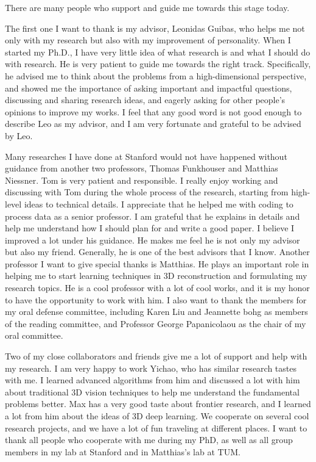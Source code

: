 There are many people who support and guide me towards this stage today.

The first one I want to thank is my advisor, Leonidas Guibas, who helps me not only with my research but also with my improvement of personality.
When I started my Ph.D., I have very little idea of what research is and what I should do with research. He is very patient to guide me towards the right track. Specifically, he advised me to think about the problems from a high-dimensional perspective, and showed me the importance of asking important and impactful questions, discussing and sharing research ideas, and eagerly asking for other people's opinions to improve my works. I feel that any good word is not good enough to describe Leo as my advisor, and I am very fortunate and grateful to be advised by Leo.

Many researches I have done at Stanford would not have happened without guidance from another two professors, Thomas Funkhouser and Matthias Niessner. Tom is very patient and responsible. I really enjoy working and discussing with Tom during the whole process of the research, starting from high-level ideas to technical details. I appreciate that he helped me with coding to process data as a senior professor. I am grateful that he explains in details and help me understand how I should plan for and write a good paper. I believe I improved a lot under his guidance. He makes me feel he is not only my advisor but also my friend. Generally, he is one of the best advisors that I know. Another professor I want to give special thanks is Matthias. He plays an important role in helping me to start learning techniques in 3D reconstruction and formulating my research topics. He is a cool professor with a lot of cool works, and it is my honor to have the opportunity to work with him. I also want to thank the members for my oral defense committee, including Karen Liu and Jeannette bohg as members of the reading committee, and Professor George Papanicolaou as the chair of my oral committee.

Two of my close collaborators and friends give me a lot of support and help with my research. I am very happy to work Yichao, who has similar research tastes with me. I learned advanced algorithms from him and discussed a lot with him about traditional 3D vision techniques to help me understand the fundamental problems better.
Max has a very good taste about frontier research, and I learned a lot from him about the ideas of 3D deep learning. We cooperate on several cool research projects, and we have a lot of fun traveling at different places. I want to thank all people who cooperate with me during my PhD, as well as all group members in my lab at Stanford and in Matthias's lab at TUM.

